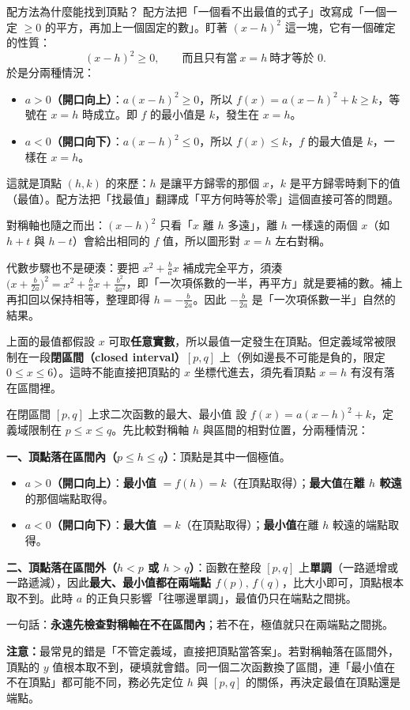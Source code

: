 \documentclass[11pt]{article}
\begin{document}
\begin{補充框}{配方法為什麼能找到頂點？}
配方法把「一個看不出最值的式子」改寫成「一個一定 $\ge 0$ 的平方，再加上一個固定的數」。盯著 $(x-h)^2$ 這一塊，它有一個確定的性質：
$$(x-h)^2\ge 0,\qquad \text{而且只有當}\ x=h\ \text{時才等於 }0.$$
於是分兩種情況：
\begin{itemize}\setlength{\itemsep}{1pt}
\item \textbf{$a>0$（開口向上）}：$a(x-h)^2\ge 0$，所以 $f(x)=a(x-h)^2+k\ge k$，等號在 $x=h$ 時成立。即 $f$ 的最小值是 $k$，發生在 $x=h$。
\item \textbf{$a<0$（開口向下）}：$a(x-h)^2\le 0$，所以 $f(x)\le k$，$f$ 的最大值是 $k$，一樣在 $x=h$。
\end{itemize}
這就是頂點 $(h,k)$ 的來歷：$h$ 是讓平方歸零的那個 $x$，$k$ 是平方歸零時剩下的值（最值）。配方法把「找最值」翻譯成「平方何時等於零」這個直接可答的問題。

對稱軸也隨之而出：$(x-h)^2$ 只看「$x$ 離 $h$ 多遠」，離 $h$ 一樣遠的兩個 $x$（如 $h+t$ 與 $h-t$）會給出相同的 $f$ 值，所以圖形對 $x=h$ 左右對稱。

代數步驟也不是硬湊：要把 $x^2+\tfrac{b}{a}x$ 補成完全平方，須湊 $\big(x+\tfrac{b}{2a}\big)^2=x^2+\tfrac{b}{a}x+\tfrac{b^2}{4a^2}$，即「一次項係數的一半，再平方」就是要補的數。補上再扣回以保持相等，整理即得 $h=-\tfrac{b}{2a}$。因此 $-\tfrac{b}{2a}$ 是「一次項係數一半」自然的結果。
\end{補充框}

\medskip
上面的最值都假設 $x$ 可取\textbf{任意實數}，所以最值一定發生在頂點。但定義域常被限制在一段\textbf{閉區間（closed interval）}$[p,q]$ 上（例如邊長不可能是負的，限定 $0\le x\le 6$）。這時不能直接把頂點的 $x$ 坐標代進去，須先看頂點 $x=h$ 有沒有落在區間裡。

\begin{補充框}{在閉區間 $[p,q]$ 上求二次函數的最大、最小值}
設 $f(x)=a(x-h)^2+k$，定義域限制在 $p\le x\le q$。先比較對稱軸 $h$ 與區間的相對位置，分兩種情況：

\textbf{一、頂點落在區間內（$p\le h\le q$）}：頂點是其中一個極值。
\begin{itemize}\setlength{\itemsep}{1pt}
\item \textbf{$a>0$（開口向上）}：\textbf{最小值} $=f(h)=k$（在頂點取得）；\textbf{最大值}在\textbf{離 $h$ 較遠}的那個端點取得。
\item \textbf{$a<0$（開口向下）}：\textbf{最大值} $=k$（在頂點取得）；\textbf{最小值}在離 $h$ 較遠的端點取得。
\end{itemize}

\textbf{二、頂點落在區間外（$h<p$ 或 $h>q$）}：函數在整段 $[p,q]$ 上\textbf{單調}（一路遞增或一路遞減），因此\textbf{最大、最小值都在兩端點 $f(p),\,f(q)$}，比大小即可，頂點根本取不到。此時 $a$ 的正負只影響「往哪邊單調」，最值仍只在端點之間挑。

一句話：\textbf{永遠先檢查對稱軸在不在區間內}；若不在，極值就只在兩端點之間挑。

\textbf{注意：}最常見的錯是「不管定義域，直接把頂點當答案」。若對稱軸落在區間外，頂點的 $y$ 值根本取不到，硬填就會錯。同一個二次函數換了區間，連「最小值在不在頂點」都可能不同，務必先定位 $h$ 與 $[p,q]$ 的關係，再決定最值在頂點還是端點。
\end{補充框}
\end{document}
